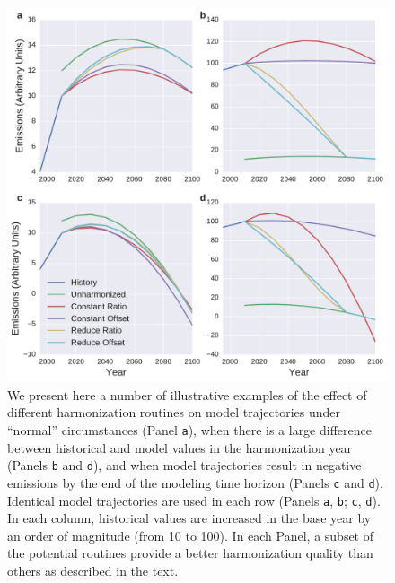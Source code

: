 \documentclass[review]{elsarticle}
\newcommand{\code}[1]{\lstinline[basicstyle=\ttfamily\color{black}]|#1|}
\begin{document}
\begin{figure}
  \begin{center}
    \includegraphics[width=\textwidth]{cases.pdf}
    \caption[]{
      \label{fig:cases}
      We present here a number of illustrative examples of the effect of
      different harmonization routines on model trajectories under ``normal''
      circumstances (Panel \code{a}), when there is a large difference between
      historical and model values in the harmonization year (Panels \code{b} and
      \code{d}), and when model trajectories result in negative emissions by the
      end of the modeling time horizon (Panels \code{c} and \code{d}). Identical
      model trajectories are used in each row (Panels \code{a}, \code{b};
      \code{c}, \code{d}). In each column, historical values are increased in
      the base year by an order of magnitude (from 10 to 100). In each Panel, a
      subset of the potential routines provide a better harmonization quality
      than others as described in the text.  }
  \end{center}
\end{figure}
\end{document}
